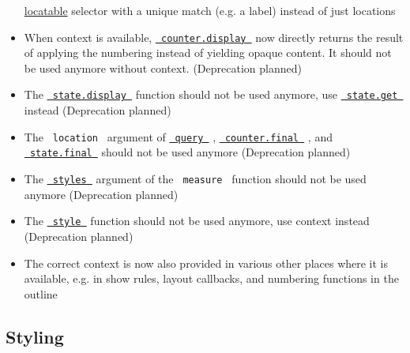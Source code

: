 \begin{itemize}
  \href{/docs/reference/introspection/location/\#locatable}{locatable}
  selector with a unique match (e.g. a label) instead of just locations
\item
  When context is available,
  \href{/docs/reference/introspection/counter/\#definitions-display}{\texttt{\ counter.display\ }}
  now directly returns the result of applying the numbering instead of
  yielding opaque content. It should not be used anymore without
  context. (Deprecation planned)
\item
  The
  \href{/docs/reference/introspection/state/\#definitions-display}{\texttt{\ state.display\ }}
  function should not be used anymore, use
  \href{/docs/reference/introspection/state/\#definitions-get}{\texttt{\ state.get\ }}
  instead (Deprecation planned)
\item
  The \texttt{\ location\ } argument of
  \href{/docs/reference/introspection/query/}{\texttt{\ query\ }} ,
  \href{/docs/reference/introspection/counter/\#definitions-final}{\texttt{\ counter.final\ }}
  , and
  \href{/docs/reference/introspection/state/\#definitions-final}{\texttt{\ state.final\ }}
  should not be used anymore (Deprecation planned)
\item
  The
  \href{/docs/reference/layout/measure/\#parameters-styles}{\texttt{\ styles\ }}
  argument of the \texttt{\ measure\ } function should not be used
  anymore (Deprecation planned)
\item
  The \href{/docs/reference/foundations/style/}{\texttt{\ style\ }}
  function should not be used anymore, use context instead (Deprecation
  planned)
\item
  The correct context is now also provided in various other places where
  it is available, e.g. in show rules, layout callbacks, and numbering
  functions in the outline
\end{itemize}

\subsection{Styling}\label{styling}

